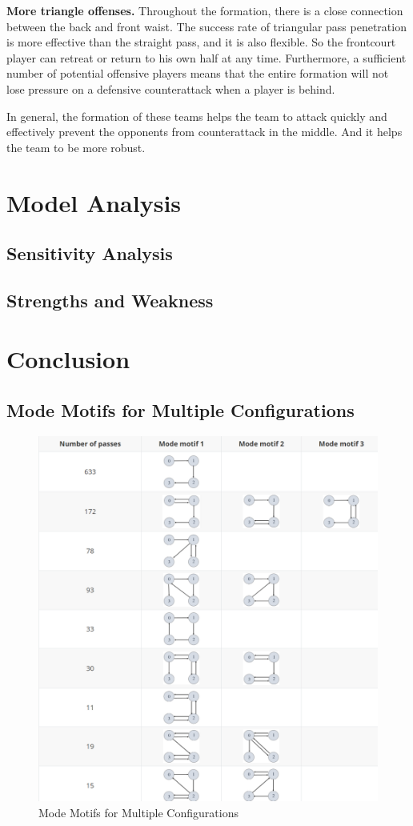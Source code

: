 \documentclass{mcmthesis}
\begin{document}
\textbf{More triangle offenses.} Throughout the formation, there is a close connection between the back and front waist. The success rate of triangular pass penetration is more effective than the straight pass, and it is also flexible. So the frontcourt player can retreat or return to his own half at any time. Furthermore, a sufficient number of potential offensive players means that the entire formation will not lose pressure on a defensive counterattack when a player is behind.
\par
In general, the formation of these teams helps the team to attack quickly and effectively prevent the opponents from counterattack in the middle. And it helps the team to be more robust.

\section{Model Analysis}
\subsection{Sensitivity Analysis}
\subsection{Strengths and Weakness}
\section{Conclusion}


\newpage

\begin{appendices}

\section{Mode Motifs for Multiple Configurations}

\begin{figure}[h]
	\centering
	\includegraphics[width=\textwidth]{figures/motif4.png}
	\caption{Mode Motifs for Multiple Configurations}
	\label{fig:motif4}
\end{figure}

\end{appendices}
\end{document}
